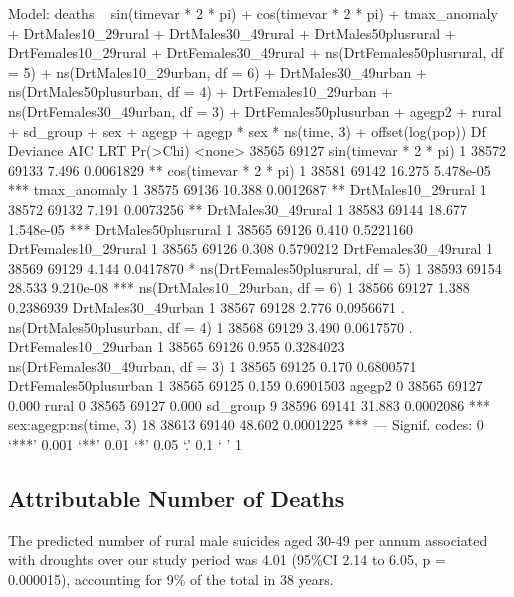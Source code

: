 \documentclass[a4paper]{article}                %
\begin{document}
\begin{Schunk}
\begin{Soutput}
Model:
deaths ~ sin(timevar * 2 * pi) + cos(timevar * 2 * pi) + tmax_anomaly + 
    DrtMales10_29rural + DrtMales30_49rural + DrtMales50plusrural + 
    DrtFemales10_29rural + DrtFemales30_49rural + ns(DrtFemales50plusrural, 
    df = 5) + ns(DrtMales10_29urban, df = 6) + DrtMales30_49urban + 
    ns(DrtMales50plusurban, df = 4) + DrtFemales10_29urban + 
    ns(DrtFemales30_49urban, df = 3) + DrtFemales50plusurban + 
    agegp2 + rural + sd_group + sex + agegp + agegp * sex * ns(time, 
    3) + offset(log(pop))
                                  Df Deviance   AIC    LRT  Pr(>Chi)    
<none>                                  38565 69127                     
sin(timevar * 2 * pi)              1    38572 69133  7.496 0.0061829 ** 
cos(timevar * 2 * pi)              1    38581 69142 16.275 5.478e-05 ***
tmax_anomaly                       1    38575 69136 10.388 0.0012687 ** 
DrtMales10_29rural                 1    38572 69132  7.191 0.0073256 ** 
DrtMales30_49rural                 1    38583 69144 18.677 1.548e-05 ***
DrtMales50plusrural                1    38565 69126  0.410 0.5221160    
DrtFemales10_29rural               1    38565 69126  0.308 0.5790212    
DrtFemales30_49rural               1    38569 69129  4.144 0.0417870 *  
ns(DrtFemales50plusrural, df = 5)  1    38593 69154 28.533 9.210e-08 ***
ns(DrtMales10_29urban, df = 6)     1    38566 69127  1.388 0.2386939    
DrtMales30_49urban                 1    38567 69128  2.776 0.0956671 .  
ns(DrtMales50plusurban, df = 4)    1    38568 69129  3.490 0.0617570 .  
DrtFemales10_29urban               1    38565 69126  0.955 0.3284023    
ns(DrtFemales30_49urban, df = 3)   1    38565 69125  0.170 0.6800571    
DrtFemales50plusurban              1    38565 69125  0.159 0.6901503    
agegp2                             0    38565 69127  0.000              
rural                              0    38565 69127  0.000              
sd_group                           9    38596 69141 31.883 0.0002086 ***
sex:agegp:ns(time, 3)             18    38613 69140 48.602 0.0001225 ***
---
Signif. codes:  0 ‘***’ 0.001 ‘**’ 0.01 ‘*’ 0.05 ‘.’ 0.1 ‘ ’ 1
\end{Soutput}
\end{Schunk}
\clearpage

\subsection{Attributable Number of Deaths}


        The predicted number of rural male suicides aged 30-49 per annum associated with droughts over our study period was 4.01 (95\%CI 2.14 to 6.05, p = 0.000015), accounting for 9\% of the total in 38 years.
\end{document}
